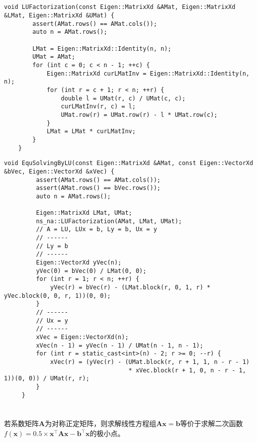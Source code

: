 \documentclass[12pt, onecolumn]{article}
\newcommand\normf{\fangsong}
\begin{document}
	\subsection{\normf{关键代码}}
	\begin{lstlisting}[caption=\normf 对矩阵$\boldsymbol{A}$的LU分解]
    void LUFactorization(const Eigen::MatrixXd &AMat, Eigen::MatrixXd &LMat, Eigen::MatrixXd &UMat) {
        assert(AMat.rows() == AMat.cols());
        auto n = AMat.rows();

        LMat = Eigen::MatrixXd::Identity(n, n);
        UMat = AMat;
        for (int c = 0; c < n - 1; ++c) {
            Eigen::MatrixXd curLMatInv = Eigen::MatrixXd::Identity(n, n);
            for (int r = c + 1; r < n; ++r) {
                double l = UMat(r, c) / UMat(c, c);
                curLMatInv(r, c) = l;
                UMat.row(r) = UMat.row(r) - l * UMat.row(c);
            }
            LMat = LMat * curLMatInv;
        }
    }
	\end{lstlisting}
	
	\begin{lstlisting}[caption=\normf 求解线性方程组]
	 void EquSolvingByLU(const Eigen::MatrixXd &AMat, const Eigen::VectorXd &bVec, Eigen::VectorXd &xVec) {
	     assert(AMat.rows() == AMat.cols());
	     assert(AMat.rows() == bVec.rows());
	     auto n = AMat.rows();
	
	     Eigen::MatrixXd LMat, UMat;
	     ns_na::LUFactorization(AMat, LMat, UMat);
	     // A = LU, LUx = b, Ly = b, Ux = y
	     // ------
	     // Ly = b
	     // ------
	     Eigen::VectorXd yVec(n);
	     yVec(0) = bVec(0) / LMat(0, 0);
	     for (int r = 1; r < n; ++r) {
	         yVec(r) = bVec(r) - (LMat.block(r, 0, 1, r) * yVec.block(0, 0, r, 1))(0, 0);
	     }
	     // ------
	     // Ux = y
	     // ------
	     xVec = Eigen::VectorXd(n);
	     xVec(n - 1) = yVec(n - 1) / UMat(n - 1, n - 1);
	     for (int r = static_cast<int>(n) - 2; r >= 0; --r) {
	         xVec(r) = (yVec(r) - (UMat.block(r, r + 1, 1, n - r - 1)
	                               * xVec.block(r + 1, 0, n - r - 1, 1))(0, 0)) / UMat(r, r);
	     }
	 }
	\end{lstlisting}
	
	\newpage
	\section{\normf{最速梯度下降}}
	\subsection{\normf{算法描述}}
	若系数矩阵$\boldsymbol{A}$为对称正定矩阵，则求解线性方程组$\boldsymbol{Ax}=\boldsymbol{b}$等价于求解二次函数$f(\boldsymbol{x})=0.5\times \boldsymbol{x}^\top\boldsymbol{A}\boldsymbol{x}-\boldsymbol{b}^\top\boldsymbol{x}$的极小点。
	
\end{document}
